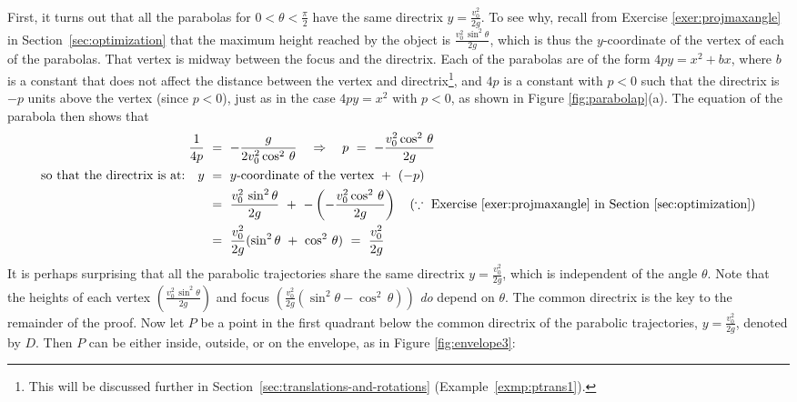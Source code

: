 \begin{exmp}
First, it turns out that all the parabolas for $0<\theta<\frac{\pi}{2}$ have the
same directrix $y=\frac{v_0^2}{2g}$. To see why, recall from Exercise
\ref{exer:projmaxangle} in Section~\ref{sec:optimization} that the maximum height reached by the
object is $\frac{v_0^2\,\sin^2 \theta}{2g}$, which is thus the $y$-coordinate of
the vertex of each of the parabolas. That vertex is midway between the focus and the
directrix. Each of the parabolas are of the form $4py = x^2 + bx$, where $b$ is a constant
that does not affect the distance between the vertex and directrix\footnote{This
will be discussed further in Section~\ref{sec:translations-and-rotations} (Example~\ref{exmp:ptrans1}).}, and $4p$ is a constant with $p<0$
such that the directrix is $-p$ units above the vertex (since $p<0$), just as in
the case $4py=x^2$ with $p<0$, as shown in Figure \ref{fig:parabolap}(a). The equation of the parabola then shows that
\begin{align*}
\frac{1}{4p} ~&=~ -\frac{g}{2v_0^2 \cos^2\,\theta} \quad\Rightarrow\quad
p ~=~ -\frac{v_0^2 \cos^2\,\theta}{2g}\\
\text{so that the directrix is at:}\quad y ~&=~ \text{$y$-coordinate of the vertex} ~+~ (-p)\\
&=~ \frac{v_0^2\,\sin^2 \theta}{2g} ~+~ -\left(-\frac{v_0^2 \cos^2\,\theta}{2g}\right) \quad\left(\because~\text{Exercise
\ref{exer:projmaxangle} in Section~\ref{sec:optimization}}\right)\\
&=~ \frac{v_0^2}{2g}(\sin^2 \theta ~+~ \cos^2\,\theta) ~=~ \frac{v_0^2}{2g}
\end{align*}
It is perhaps surprising that all the parabolic trajectories share the same
directrix $y=\frac{v_0^2}{2g}$, which is independent of the angle $\theta$. Note
that the heights of each vertex $\left(\frac{v_0^2\,\sin^2 \theta}{2g}\right)$
and focus $\left(\frac{v_0^2}{2g}(\sin^2 \theta - \cos^2\,\theta)\right)$
\emph{do} depend on $\theta$. The common directrix is the key to the remainder
of the proof.
\newpage
\noindent Now let $P$ be a point in the first quadrant below the common directrix
of the parabolic trajectories, $y=\frac{v_0^2}{2g}$, denoted by $D$. Then $P$ can be
either inside, outside, or on the envelope, as in Figure \ref{fig:envelope3}:


\end{exmp}
